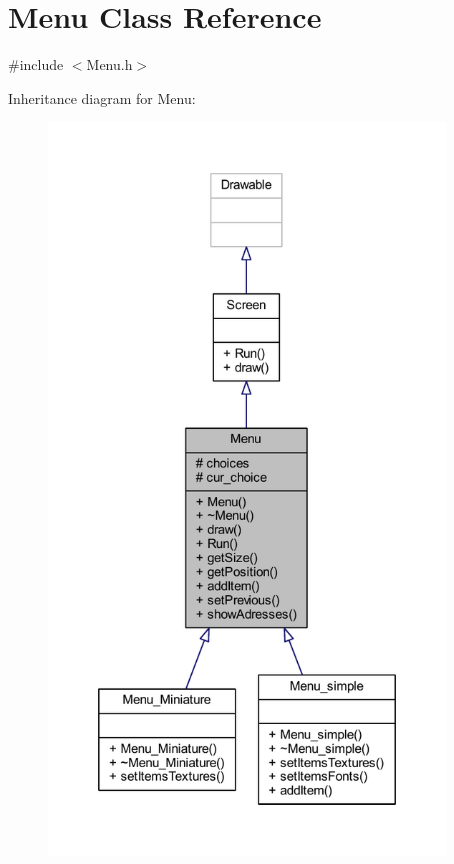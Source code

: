\hypertarget{class_menu}{}\section{Menu Class Reference}
\label{class_menu}


{\ttfamily \#include $<$Menu.\+h$>$}



Inheritance diagram for Menu\+:\nopagebreak
\begin{figure}[H]
\begin{center}
\leavevmode
\includegraphics[height=550pt]{class_menu__inherit__graph}
\end{center}
\end{figure}


